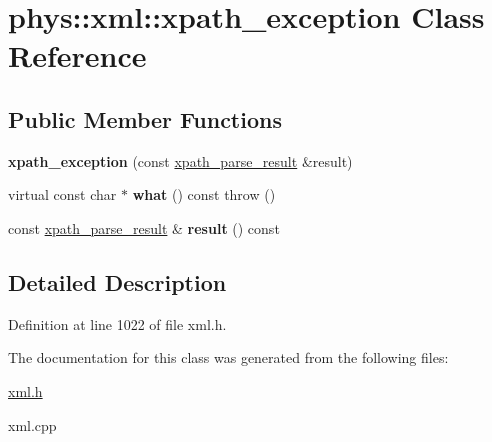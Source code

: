 \hypertarget{classphys_1_1xml_1_1xpath__exception}{
\section{phys::xml::xpath\_\-exception Class Reference}
\label{d1/dcf/classphys_1_1xml_1_1xpath__exception}
}
\subsection*{Public Member Functions}
\begin{DoxyCompactItemize}
\item 
\hypertarget{classphys_1_1xml_1_1xpath__exception_a9a2667d949e2a366f81b8bf8ce6e30a0}{
{\bfseries xpath\_\-exception} (const \hyperlink{structphys_1_1xml_1_1xpath__parse__result}{xpath\_\-parse\_\-result} \&result)}
\label{d1/dcf/classphys_1_1xml_1_1xpath__exception_a9a2667d949e2a366f81b8bf8ce6e30a0}

\item 
\hypertarget{classphys_1_1xml_1_1xpath__exception_ab36b83bb0bacf37aa0d298f724d2a668}{
virtual const char $\ast$ {\bfseries what} () const   throw ()}
\label{d1/dcf/classphys_1_1xml_1_1xpath__exception_ab36b83bb0bacf37aa0d298f724d2a668}

\item 
\hypertarget{classphys_1_1xml_1_1xpath__exception_ac6a47c84f9d434f0eb5d465e5291c490}{
const \hyperlink{structphys_1_1xml_1_1xpath__parse__result}{xpath\_\-parse\_\-result} \& {\bfseries result} () const }
\label{d1/dcf/classphys_1_1xml_1_1xpath__exception_ac6a47c84f9d434f0eb5d465e5291c490}

\end{DoxyCompactItemize}


\subsection{Detailed Description}


Definition at line 1022 of file xml.h.



The documentation for this class was generated from the following files:\begin{DoxyCompactItemize}
\item 
\hyperlink{xml_8h}{xml.h}\item 
xml.cpp\end{DoxyCompactItemize}
